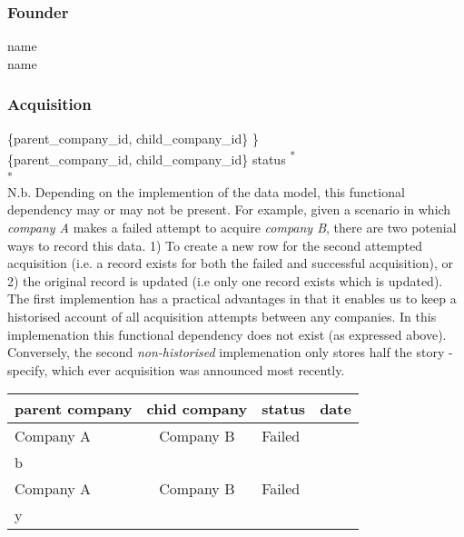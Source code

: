 \documentclass[12pt]{article}
\begin{document}
\subsubsection{Founder}
name  \\
name 

\subsubsection{Acquisition}
\{parent\_company\_id, child\_company\_id\} \} \\
 \{parent\_company\_id, child\_company\_id\} \not \Rightarrow status \textsuperscript{*} \\

\textsuperscript{*} \\ N.b. Depending on the implemention of the data model, this functional dependency may or may not be present. For example, given a scenario in which \emph{company A} makes a failed attempt to acquire \emph{company B}, there are two potenial ways to record this data. 1) To create a new row for the second attempted acquisition (i.e. a record exists for both the failed and successful acquisition), or 2) the original record is updated (i.e only one record exists which is updated). The first implemention has a practical advantages in that it enables us to keep a historised account of all acquisition attempts between any companies. In this implemenation this functional dependency does not exist (as expressed above). Conversely, the second \textit{non-historised} implemenation only stores half the story - specify, which ever acquisition was announced most recently.

\begin{tabular}{l|c|l|r}
parent company&chid company&status&date\\\hline
Company A&Company B&Failed\\b\\
Company A&Company B&Failed\\y\\
\end{tabular}
\end{document}
